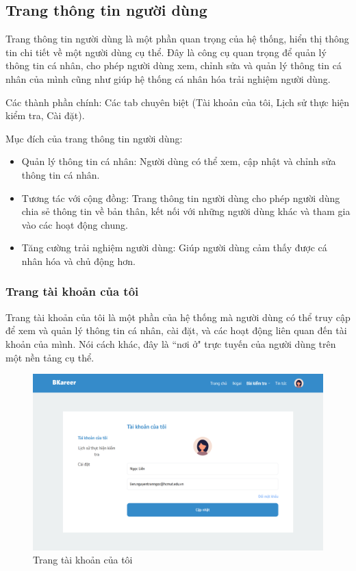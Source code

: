 \subsection{Trang thông tin người dùng}
Trang thông tin người dùng là một phần quan trọng của hệ thống, hiển thị thông tin chi tiết về một người dùng cụ thể. Đây là công cụ quan trọng để quản lý thông tin cá nhân, cho phép người dùng xem, chỉnh sửa và quản lý thông tin cá nhân của mình cũng như giúp hệ thống cá nhân hóa trải nghiệm người dùng.

Các thành phần chính: Các tab chuyên biệt (Tài khoản của tôi, Lịch sử thực hiện kiểm tra, Cài đặt).

Mục đích của trang thông tin người dùng:
\begin{itemize}
    \item Quản lý thông tin cá nhân: Người dùng có thể xem, cập nhật và chỉnh sửa thông tin cá nhân.
    \item Tương tác với cộng đồng: Trang thông tin người dùng cho phép người dùng chia sẻ thông tin về bản thân, kết nối với những người dùng khác và tham gia vào các hoạt động chung.
    \item Tăng cường trải nghiệm người dùng: Giúp người dùng cảm thấy được cá nhân hóa và chủ động hơn.
\end{itemize}


\subsubsection{Trang tài khoản của tôi}
Trang tài khoản của tôi là một phần của hệ thống mà người dùng có thể truy cập để xem và quản lý thông tin cá nhân, cài đặt, và các hoạt động liên quan đến tài khoản của mình. Nói cách khác, đây là ``nơi ở" trực tuyến của người dùng trên một nền tảng cụ thể.

\begin{figure}[H]
    \centering
    \includegraphics[width=0.8\linewidth]{images/chap5/profileScreen.png}
    \vspace{0.5cm}
    \caption{Trang tài khoản của tôi}
\end{figure}


